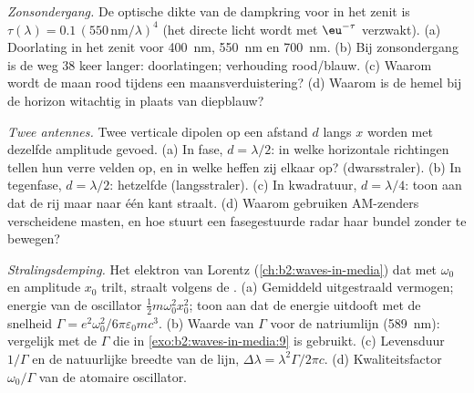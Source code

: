 \begin{exercise}[$\star\star$]\label{exo:b2:dipole-radiation:8}
\emph{Zonsondergang.} De optische dikte van de dampkring voor
 in het zenit is
$\tau(\lambda) = 0.1\,(550\,\text{nm}/\lambda)^4$ (het directe licht wordt
met $\eu^{-\tau}$ verzwakt). (a) Doorlating in het zenit voor \qty{400}{nm},
\qty{550}{nm} en \qty{700}{nm}. (b) Bij zonsondergang is de weg $38$ keer
langer: doorlatingen; verhouding rood/blauw. (c) Waarom wordt de maan rood
tijdens een maansverduistering? (d) Waarom is de hemel bij de horizon
witachtig in plaats van diepblauw?
\end{exercise}

\begin{exercise}[$\star\star$]\label{exo:b2:dipole-radiation:9}
\emph{Twee antennes.} Twee verticale dipolen op een afstand $d$ langs $x$
worden met dezelfde amplitude gevoed. (a) In fase, $d = \lambda/2$: in welke
horizontale richtingen tellen hun verre velden op, en in welke heffen zij
elkaar op? (dwarsstraler). (b) In tegenfase, $d = \lambda/2$: hetzelfde
(langsstraler). (c) In kwadratuur, $d = \lambda/4$: toon aan dat de rij maar
naar één kant straalt. (d) Waarom gebruiken AM-zenders verscheidene masten,
en hoe stuurt een fasegestuurde radar haar bundel zonder te bewegen?
\end{exercise}

\begin{exercise}[$\star\star\star$]\label{exo:b2:dipole-radiation:10}
\emph{Stralingsdemping.} Het elektron van Lorentz
(\cref{ch:b2:waves-in-media}) dat met $\omega_0$ en amplitude $x_0$ trilt,
straalt volgens de . (a) Gemiddeld uitgestraald vermogen;
energie van de oscillator $\tfrac12m\omega_0^2x_0^2$; toon aan dat de
energie uitdooft met de snelheid
$\Gamma = e^2\omega_0^2/6\pi\varepsilon_0mc^3$. (b) Waarde van $\Gamma$ voor
de natriumlijn (\qty{589}{nm}): vergelijk met de $\Gamma$ die in
\cref{exo:b2:waves-in-media:9} is gebruikt. (c) Levensduur $1/\Gamma$ en de
natuurlijke breedte van de lijn, $\Delta\lambda = \lambda^2\Gamma/2\pi c$.
(d) Kwaliteitsfactor $\omega_0/\Gamma$ van de atomaire oscillator.
\end{exercise}

